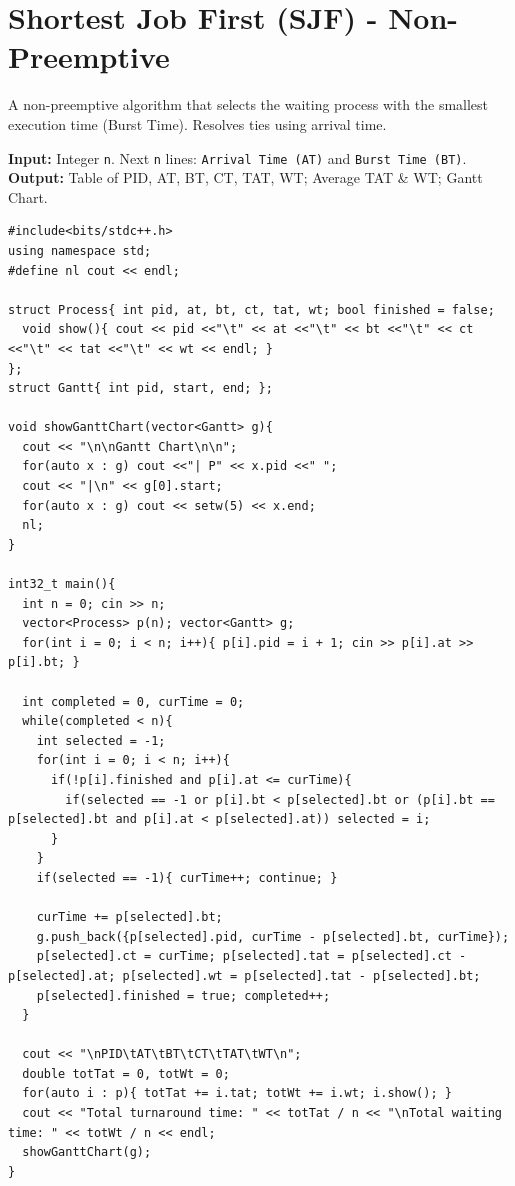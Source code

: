 \documentclass[10pt, a4paper]{article}
\begin{document}
\section{Shortest Job First (SJF) - Non-Preemptive}
A non-preemptive algorithm that selects the waiting process with the smallest execution time (Burst Time). Resolves ties using arrival time.

\begin{tcolorbox}[title=Input \& Output Format, iobox]
\textbf{Input:} Integer \texttt{n}. Next \texttt{n} lines: \texttt{Arrival Time (AT)} and \texttt{Burst Time (BT)}.\\
\textbf{Output:} Table of PID, AT, BT, CT, TAT, WT; Average TAT \& WT; Gantt Chart.
\end{tcolorbox}

\begin{lstlisting}
#include<bits/stdc++.h>
using namespace std;
#define nl cout << endl;

struct Process{ int pid, at, bt, ct, tat, wt; bool finished = false;
  void show(){ cout << pid <<"\t" << at <<"\t" << bt <<"\t" << ct <<"\t" << tat <<"\t" << wt << endl; }
};
struct Gantt{ int pid, start, end; };

void showGanttChart(vector<Gantt> g){
  cout << "\n\nGantt Chart\n\n";
  for(auto x : g) cout <<"| P" << x.pid <<" ";
  cout << "|\n" << g[0].start;
  for(auto x : g) cout << setw(5) << x.end;
  nl;
}

int32_t main(){
  int n = 0; cin >> n;
  vector<Process> p(n); vector<Gantt> g;
  for(int i = 0; i < n; i++){ p[i].pid = i + 1; cin >> p[i].at >> p[i].bt; }

  int completed = 0, curTime = 0;
  while(completed < n){
    int selected = -1;
    for(int i = 0; i < n; i++){
      if(!p[i].finished and p[i].at <= curTime){
        if(selected == -1 or p[i].bt < p[selected].bt or (p[i].bt == p[selected].bt and p[i].at < p[selected].at)) selected = i;
      }
    }
    if(selected == -1){ curTime++; continue; }
    
    curTime += p[selected].bt;
    g.push_back({p[selected].pid, curTime - p[selected].bt, curTime});
    p[selected].ct = curTime; p[selected].tat = p[selected].ct - p[selected].at; p[selected].wt = p[selected].tat - p[selected].bt;
    p[selected].finished = true; completed++;
  }
  
  cout << "\nPID\tAT\tBT\tCT\tTAT\tWT\n";
  double totTat = 0, totWt = 0;
  for(auto i : p){ totTat += i.tat; totWt += i.wt; i.show(); }
  cout << "Total turnaround time: " << totTat / n << "\nTotal waiting time: " << totWt / n << endl;
  showGanttChart(g);
}
\end{lstlisting}
\newpage
\end{document}
